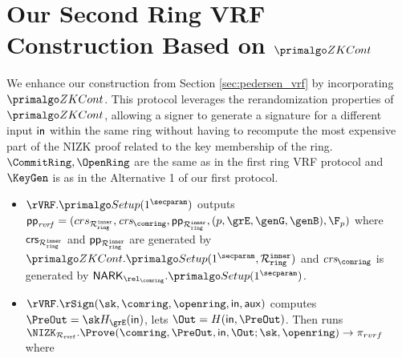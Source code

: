 
\section{Our Second Ring VRF Construction Based on $ \ZKCont $}
\label{subsec:rvrf_faster}
We enhance our construction from Section \ref{sec:pedersen_vrf} by incorporating $ \ZKCont $. This protocol leverages the rerandomization properties of $ \ZKCont $, allowing a signer to generate a signature for a different input $ \mathsf{in} $ within the same ring without having to recompute the most expensive part of the NIZK proof related to the key membership of the ring. $\CommitRing, \OpenRing $ are the same as in the first ring VRF protocol and $ \KeyGen$ is as in the Alternative 1 of our first protocol.
\begin{itemize}
	\item $ \rVRF.\Setup(1^\secparam)   $ outputs $ \pprvrf = (crs_{\relinner}, \crsnark,  \pp_{\relinner}, (p, \grE,\genG, \genB), \F_p) $ where $ \mathsf{crs}_{\mathcal{R}_{\mathtt{ring}}^{\mathtt{inner}}}$ and $\mathsf{pp}_{\mathcal{R}_{\mathtt{ring}}^{\mathtt{inner}}} $ are generated by $ \ZKCont.\Setup(1^\secparam, \relinner) $ and $ \crsnark $ is generated by $ \NARK_{\relcomring}.\Setup(1^\secparam) $.
	
	\item $\rVRF.\rSign(\sk,\comring, \openring,\msg,\aux) $ computes $ \PreOut = \sk H_\grE(\msg) $, lets $ \Out = H(\msg, \PreOut) $. Then runs $ \NIZK_{\relrvrf}.\Prove(\comring, \allowbreak \PreOut, \allowbreak \msg, \allowbreak \Out; \sk,\openring)\rightarrow \pi_{rvrf}$ where
	

\end{itemize}
